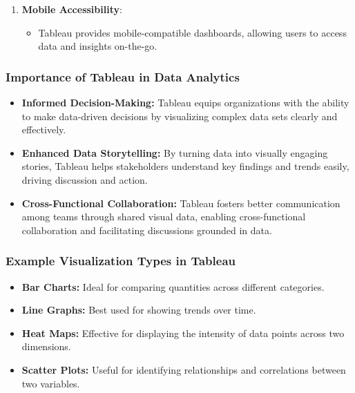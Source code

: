 \documentclass[aspectratio=169]{beamer}
\begin{document}
\begin{frame}[fragile]
\begin{enumerate}
        \item \textbf{Mobile Accessibility}:
        \begin{itemize}
            \item Tableau provides mobile-compatible dashboards, allowing users to access data and insights on-the-go.
        \end{itemize}
    \end{enumerate}
\end{frame}

\begin{frame}[fragile]
    \frametitle{Importance of Tableau in Data Analytics}
    \begin{itemize}
        \item \textbf{Informed Decision-Making:} Tableau equips organizations with the ability to make data-driven decisions by visualizing complex data sets clearly and effectively.
        
        \item \textbf{Enhanced Data Storytelling:} By turning data into visually engaging stories, Tableau helps stakeholders understand key findings and trends easily, driving discussion and action.
        
        \item \textbf{Cross-Functional Collaboration:} Tableau fosters better communication among teams through shared visual data, enabling cross-functional collaboration and facilitating discussions grounded in data.
    \end{itemize}
\end{frame}

\begin{frame}[fragile]
    \frametitle{Example Visualization Types in Tableau}
    \begin{itemize}
        \item \textbf{Bar Charts:} Ideal for comparing quantities across different categories.
        \item \textbf{Line Graphs:} Best used for showing trends over time.
        \item \textbf{Heat Maps:} Effective for displaying the intensity of data points across two dimensions.
        \item \textbf{Scatter Plots:} Useful for identifying relationships and correlations between two variables.
    \end{itemize}
\end{frame}
\end{document}
